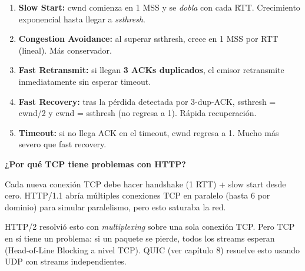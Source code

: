 \begin{enumerate}
    \item \textbf{Slow Start:} cwnd comienza en 1 MSS y se \textit{dobla}
          con cada RTT. Crecimiento exponencial hasta llegar a \textit{ssthresh}.
    \item \textbf{Congestion Avoidance:} al superar ssthresh, crece en
          1 MSS por RTT (lineal). Más conservador.
    \item \textbf{Fast Retransmit:} si llegan \textbf{3 ACKs duplicados},
          el emisor retransmite inmediatamente sin esperar timeout.
    \item \textbf{Fast Recovery:} tras la pérdida detectada por 3-dup-ACK,
          ssthresh = cwnd/2 y cwnd = ssthresh (no regresa a 1). Rápida recuperación.
    \item \textbf{Timeout:} si no llega ACK en el timeout, cwnd regresa a 1.
          Mucho más severo que fast recovery.
\end{enumerate}

\begin{cuidado}
\textbf{¿Por qué TCP tiene problemas con HTTP?}

Cada nueva conexión TCP debe hacer handshake (1 RTT) + slow start desde cero.
HTTP/1.1 abría múltiples conexiones TCP en paralelo (hasta 6 por dominio)
para simular paralelismo, pero esto saturaba la red.

HTTP/2 resolvió esto con \textit{multiplexing} sobre una sola conexión TCP.
Pero TCP en sí tiene un problema: si un paquete se pierde, todos los streams
esperan (Head-of-Line Blocking a nivel TCP). QUIC (ver capítulo 8)
resuelve esto usando UDP con streams independientes.
\end{cuidado}
